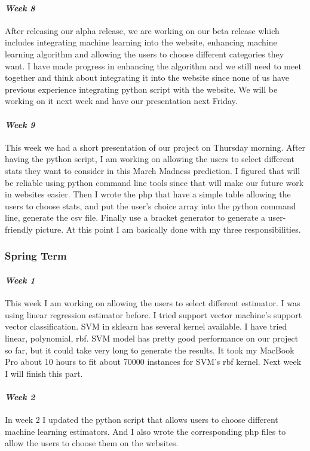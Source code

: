 \documentclass[onecolumn, draftclsnofoot,10pt, compsoc]{IEEEtran}
\begin{document}
\paragraph{\emph{Week 8}}
After releasing our alpha release, we are working on our beta release which includes integrating machine learning into the website, enhancing machine learning algorithm and allowing the users to choose different categories they want. I have made progress in enhancing the algorithm and we still need to meet together and think about integrating it into the website since none of us have previous experience integrating python script with the website. We will be working on it next week and have our presentation next Friday.
\paragraph{\emph{Week 9}}
This week we had a short presentation of our project on Thursday morning. After having the python script, I am working on allowing the users to select different stats they want to consider in this March Madness prediction. I figured that will be reliable using python command line tools since that will make our future work in websites easier. Then I wrote the php that have a simple table allowing the users to choose stats, and put the user's choice array into the python command line, generate the csv file. Finally use a bracket generator to generate a user-friendly picture. At this point I am basically done with my three responsibilities.
\subsubsection{Spring Term}
\paragraph{\emph{Week 1}}
This week I am working on allowing the users to select different estimator. I was using linear regression estimator before. I tried support vector machine's support vector classification. SVM in sklearn has several kernel available. I have tried linear, polynomial, rbf. SVM model has pretty good performance on our project so far, but it could take very long to generate the results. It took my MacBook Pro about 10 hours to fit about 70000 instances for SVM's rbf kernel. Next week I will finish this part.
\paragraph{\emph{Week 2}}
In week 2 I updated the python script that allows users to choose different machine learning estimators. And I also wrote the corresponding php files to allow the users to choose them on the websites.
\end{document}
